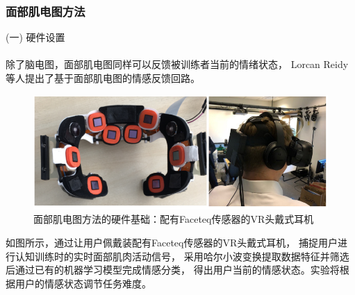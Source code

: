 \documentclass[12pt]{article}
\begin{document}
            \subsubsection{面部肌电图方法}
            (一) 硬件设置\paragraph{}
            除了脑电图，面部肌电图同样可以反馈被训练者当前的情绪状态，
            Lorcan Reidy\cite{ref15}等人提出了基于面部肌电图的情感反馈回路。
            \begin{figure}[H]
            	
            	\centering
            	\includegraphics[scale=0.8]{images/Faceteq.png}
            	\caption{面部肌电图方法的硬件基础：配有Faceteq传感器的VR头戴式耳机\cite{ref15}}
            	\label{fig:label}
            \end{figure}
            如图所示，通过让用户佩戴装配有Faceteq传感器的VR头戴式耳机，
            捕捉用户进行认知训练时的实时面部肌肉活动信号，
            采用哈尔小波变换提取数据特征并筛选后通过已有的机器学习模型完成情感分类，
            得出用户当前的情感状态。实验将根据用户的情感状态调节任务难度。
\end{document}
